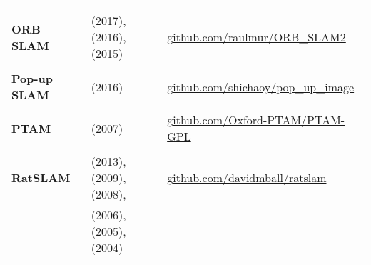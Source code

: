 \documentclass[a4paper,12pt]{scrartcl}
\begin{document}
{\begin{longtable}{l|l|l}
                           &                                                                                             &                                                                                                                              \\ [-3mm]
    \textbf{ORB SLAM}      & \cite{Mur-Artal2017} (2017), \cite{Mur-Artal2016a} (2016), \cite{Mur-Artal2015} (2015)      & \href{https://github.com/raulmur/ORB_SLAM2}{github.com/raulmur/ORB\_SLAM2}                                                   \\
                           &                                                                                             &                                                                                                                              \\ [-3mm]
    \textbf{Pop-up SLAM}   & \cite{Yang2016} (2016)                                                                      & {\href{https://github.com/shichaoy/pop_up_image}{github.com/shichaoy/pop\_up\_image}}                                        \\
                           &                                                                                             &                                                                                                                              \\ [-3mm]
    \textbf{PTAM}          & \cite{Klein2007} (2007)                                                                     & {\href{https://github.com/Oxford-PTAM/PTAM-GPL}{github.com/Oxford-PTAM/PTAM-GPL}}                                            \\
                           &                                                                                             &                                                                                                                              \\ [-3mm]
    \textbf{RatSLAM}       & \cite{Ball2013} (2013), \cite{Maddern2009} (2009), \cite{Milford2008} (2008),               & {\href{https://github.com/davidmball/ratslam}{github.com/davidmball/ratslam}}                                                \\
                           & \cite{Milford2006} (2006), \cite{Milford2005} (2005), \cite{Milford2004} (2004)             &                                                                                                                              \\

\end{longtable}}
\end{document}
